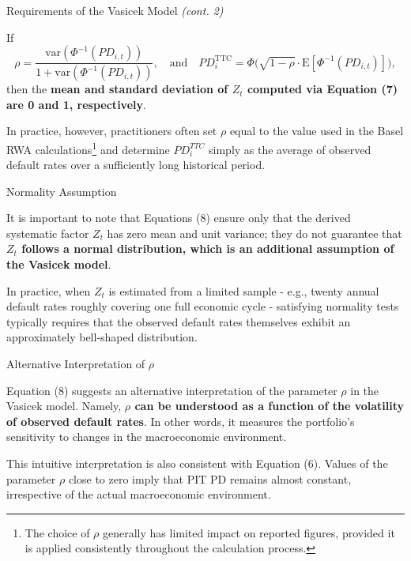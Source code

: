 \documentclass{beamer}
\begin{document}
\begin{frame}{Requirements of the Vasicek Model \textit{(cont. 2)}}
\justifying
\small

If
\begin{equation}
\rho = \frac{\mathrm{var}(\Phi^{-1}(PD_{i,t}))}{1 + \mathrm{var}(\Phi^{-1}(PD_{i,t}))}, 
\quad \text{and} \quad 
PD_i^{\mathrm{TTC}} = \Phi \Big( \sqrt{1 - \rho} \cdot \mathrm{E}[\Phi^{-1}(PD_{i,t})] \Big),
\end{equation}
then the \textbf{mean and standard deviation of $Z_t$ computed via Equation (7) are 0 and 1, respectively}.

\medskip

In practice, however, practitioners often set $\rho$ equal to the value used in the Basel RWA calculations\footnote{\tiny{The choice of $\rho$ generally has limited impact on reported figures, provided it is applied consistently throughout the calculation process.}} and determine $PD_i^{TTC}$ simply as the average of observed default rates over a sufficiently long historical period.

\end{frame}


\begin{frame}{Normality Assumption}
\justifying
\small

It is important to note that Equations (8) ensure only that the derived systematic factor $Z_t$ has zero mean and unit variance; they do not guarantee that \textbf{$Z_t$ follows a normal distribution, which is an additional assumption of the Vasicek model}. 

\medskip

In practice, when $Z_t$ is estimated from a limited sample - e.g., twenty annual default rates roughly covering one full economic cycle - satisfying normality tests typically requires that the observed default rates themselves exhibit an approximately bell-shaped distribution.
\end{frame}

\begin{frame}{Alternative Interpretation of $\rho$}
\justifying
\small

Equation (8) suggests an alternative interpretation of the parameter $\rho$ in the Vasicek model. Namely, \textbf{$\rho$ can be understood as a function of the volatility of observed default rates}. In other words, it measures the portfolio's sensitivity to changes in the macroeconomic environment.

\medskip

This intuitive interpretation is also consistent with Equation (6). Values of the parameter $\rho$ close to zero imply that PIT PD remains almost constant, irrespective of the actual macroeconomic environment.

\end{frame}
\end{document}
